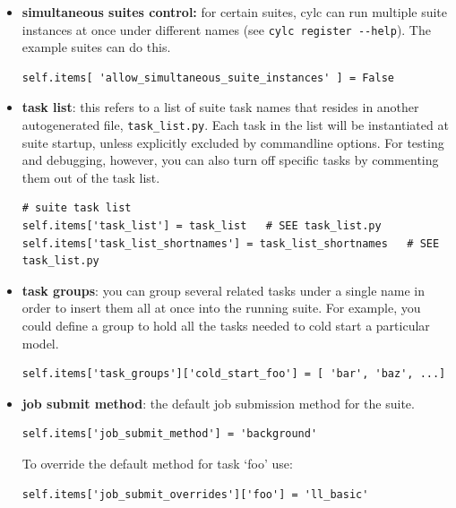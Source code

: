 \documentclass[11pt,a4paper]{article}
\begin{document}
\begin{itemize} 
    \item {\bf simultaneous suites control:} for certain suites, cylc
        can run multiple suite instances at once under different names
        (see \lstinline=cylc register --help=). The example suites
        can do this. 
         \begin{lstlisting}
self.items[ 'allow_simultaneous_suite_instances' ] = False
         \end{lstlisting}
  
    \item {\bf task list}: this refers to a list of suite task names
        that resides in another autogenerated file,
        \lstinline=task_list.py=. Each task in the list will be
        instantiated at suite startup, unless explicitly excluded by
        commandline options. For testing and debugging, however, you
        can also turn off specific tasks by commenting them out
        of the task list.
        
        \begin{lstlisting}
# suite task list
self.items['task_list'] = task_list   # SEE task_list.py
self.items['task_list_shortnames'] = task_list_shortnames   # SEE task_list.py
        \end{lstlisting}

    \item {\bf task groups}: you can group several related tasks under a
        single name in order to insert them all at once into the running
        suite. For example, you could define a group to hold all the
        tasks needed to cold start a particular model.

        \begin{lstlisting}
self.items['task_groups']['cold_start_foo'] = [ 'bar', 'baz', ...]
        \end{lstlisting}

    \item {\bf job submit method}: the default job submission method 
        for the suite.

        \begin{lstlisting}
self.items['job_submit_method'] = 'background'
        \end{lstlisting}

        To override the default method for task `foo' use:

        \begin{lstlisting}
self.items['job_submit_overrides']['foo'] = 'll_basic'
        \end{lstlisting}


\end{itemize}
\end{document}
